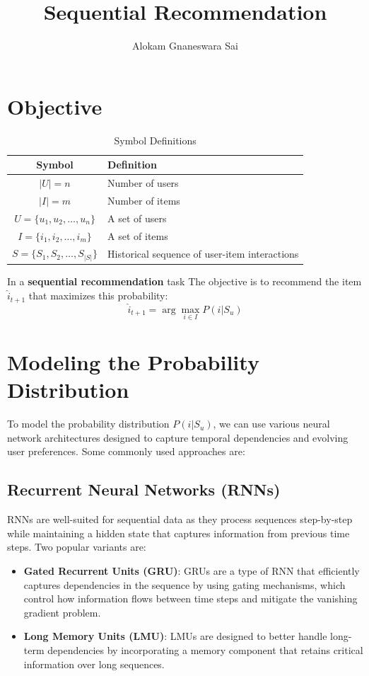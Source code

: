 \documentclass{article}
\title{Sequential Recommendation }
\author{Alokam Gnaneswara Sai}
\date{}
\begin{document}
\maketitle


\section{Objective}
\begin{table}[h!]
\centering
\caption{Symbol Definitions}
\begin{tabular}{|c|l|}
\hline
\textbf{Symbol} & \textbf{Definition} \\ \hline
$|U| = n$ & Number of users \\ \hline
$|I| = m$ & Number of items \\ \hline
$U = \{u_1, u_2, \dots, u_n\}$ & A set of users \\ \hline
$I = \{i_1, i_2, \dots, i_m\}$ & A set of items \\ \hline
$S = \{S_1, S_2, \dots, S_{|S|}\}$ & Historical sequence of user-item interactions \\ \hline
\end{tabular}
\end{table}

In a \textbf{sequential recommendation} task
The objective is to recommend the item \( \hat{i}_{t+1} \) that maximizes this probability:
\[
\hat{i}_{t+1} = \arg\max_{i \in I} P(i | S_u)
\]

\section{Modeling the Probability Distribution}
To model the probability distribution \( P(i | S_u) \), we can use various neural network architectures designed to capture temporal dependencies and evolving user preferences. Some commonly used approaches are:

\subsection{Recurrent Neural Networks (RNNs)}
RNNs are well-suited for sequential data as they process sequences step-by-step while maintaining a hidden state that captures information from previous time steps. Two popular variants are:

\begin{itemize}
    \item \textbf{Gated Recurrent Units (GRU)}: GRUs are a type of RNN that efficiently captures dependencies in the sequence by using gating mechanisms, which control how information flows between time steps and mitigate the vanishing gradient problem.
    
    \item \textbf{Long Memory Units (LMU)}: LMUs are designed to better handle long-term dependencies by incorporating a memory component that retains critical information over long sequences.
\end{itemize}
\end{document}

